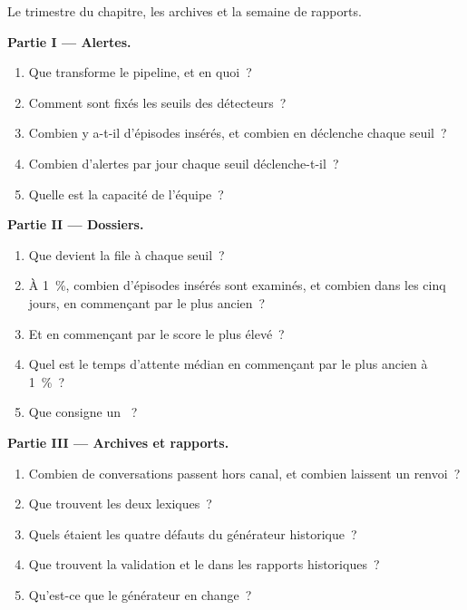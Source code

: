 \begin{problem}\label{pb:pl:surveillance-and-compliance-technology:1}
Le trimestre du chapitre, les archives et la semaine de rapports.

\medskip\noindent\textbf{Partie I --- Alertes.}
\begin{enumerate}
\item Que transforme le pipeline, et en quoi~?
\item Comment sont fixés les seuils des détecteurs~?
\item Combien y a-t-il d'épisodes insérés, et combien en déclenche chaque seuil~?
\item Combien d'alertes par jour chaque seuil déclenche-t-il~?
\item Quelle est la capacité de l'équipe~?
\end{enumerate}

\medskip\noindent\textbf{Partie II --- Dossiers.}
\begin{enumerate}[resume]
\item Que devient la file à chaque seuil~?
\item À 1~\%, combien d'épisodes insérés sont examinés, et combien dans les cinq jours, en commençant par le plus ancien~?
\item Et en commençant par le score le plus élevé~?
\item Quel est le temps d'attente médian en commençant par le plus ancien à 1~\%~?
\item Que consigne un ~?
\end{enumerate}

\medskip\noindent\textbf{Partie III --- Archives et rapports.}
\begin{enumerate}[resume]
\item Combien de conversations passent hors canal, et combien laissent un renvoi~?
\item Que trouvent les deux lexiques~?
\item Quels étaient les quatre défauts du générateur historique~?
\item Que trouvent la validation et le  dans les rapports historiques~?
\item Qu'est-ce que le générateur en  change~?
\end{enumerate}


\end{problem}
